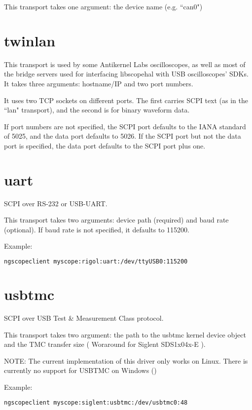 This transport takes one argument: the device name (e.g. ``can0")

\section{twinlan}

This transport is used by some Antikernel Labs oscilloscopes, as well as most of the bridge servers used for interfacing
libscopehal with USB oscilloscopes' SDKs. It takes three arguments: hostname/IP and two port numbers.

It uses two TCP sockets on different ports. The first carries SCPI text (as in the ``lan" transport), and the second is
for binary waveform data.

If port numbers are not specified, the SCPI port defaults to the IANA standard of 5025, and the data port defaults to
5026. If the SCPI port but not the data port is specified, the data port defaults to the SCPI port plus one.

\section{uart}

SCPI over RS-232 or USB-UART.

This transport takes two arguments: device path (required) and baud rate (optional). If baud rate is not specified, it
defaults to 115200.

Example:
\begin{lstlisting}[language=sh, numbers=none]
ngscopeclient myscope:rigol:uart:/dev/ttyUSB0:115200
\end{lstlisting}

\section{usbtmc}

SCPI over USB Test \& Measurement Class protocol.

This transport takes two argument: the path to the usbtmc kernel device object and the TMC transfer size ( Woraround for Siglent SDS1x04x-E ).

NOTE: The current implementation of this driver only works on Linux. There is currently no support for USBTMC on
Windows ()

Example:
\begin{lstlisting}[language=sh, numbers=none]
ngscopeclient myscope:siglent:usbtmc:/dev/usbtmc0:48
\end{lstlisting}

